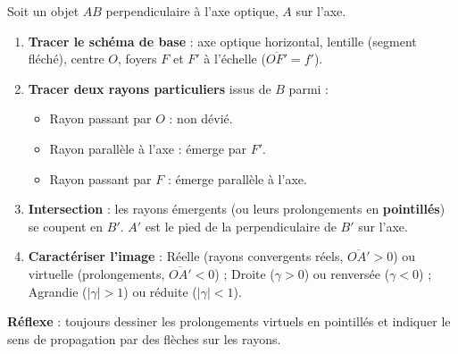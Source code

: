 \documentclass[11pt]{article}
\begin{document}
\begin{methode}
Soit un objet $AB$ perpendiculaire à l'axe optique, $A$ sur l'axe.
\begin{enumerate}
\item \textbf{Tracer le schéma de base} : axe optique horizontal, lentille (segment fléché), centre $O$, foyers $F$ et $F'$ à l'échelle ($\overline{OF'}=f'$).
\item \textbf{Tracer deux rayons particuliers} issus de $B$ parmi :
\begin{itemize}
\item Rayon passant par $O$ : non dévié.
\item Rayon parallèle à l'axe : émerge par $F'$.
\item Rayon passant par $F$ : émerge parallèle à l'axe.
\end{itemize}
\item \textbf{Intersection} : les rayons émergents (ou leurs prolongements en \textbf{pointillés}) se coupent en $B'$. $A'$ est le pied de la perpendiculaire de $B'$ sur l'axe.
\item \textbf{Caractériser l'image} : Réelle (rayons convergents réels, $\overline{OA'}>0$) ou virtuelle (prolongements, $\overline{OA'}<0$) ; Droite ($\gamma>0$) ou renversée ($\gamma<0$) ; Agrandie ($|\gamma|>1$) ou réduite ($|\gamma|<1$).
\end{enumerate}
\textbf{Réflexe} : toujours dessiner les prolongements virtuels en pointillés et indiquer le sens de propagation par des flèches sur les rayons.
\end{methode}
\end{document}
